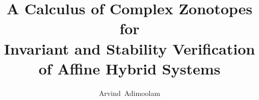 


%







\title{A Calculus of Complex Zonotopes for \\ Invariant and Stability Verification \\of Affine Hybrid Systems}
\author[shortname]{ {\Large  Arvind\ Adimoolam}\vspace{-2em}}


\date{}



